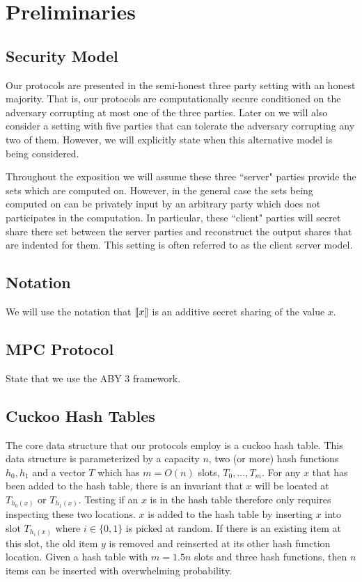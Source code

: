 \section{Preliminaries}


\subsection{Security Model}

Our protocols are presented in the semi-honest three party setting with an honest majority. That is, our protocols are computationally secure conditioned on the adversary corrupting at most one of the three parties. Later on we will also consider a setting with five parties that can tolerate the adversary corrupting any two of them. However, we will explicitly state when this alternative model is being considered.

Throughout the exposition we will assume these three ``server" parties provide the sets which are computed on. However, in the general case the sets being computed on can be privately input by an arbitrary party which does not participates in the computation. In particular, these ``client" parties will secret share there set between the server parties and reconstruct the output shares that are indented for them. This setting is often referred to as the client server model\cite{aby3, secureML}. 


\subsection{Notation}

We will use the notation that $\llbracket x\rrbracket$ is an additive secret sharing of the value $x$.


\subsection{MPC Protocol}

State that we use the ABY 3 framework. 

\subsection{Cuckoo Hash Tables}

The core data structure that our protocols employ is a cuckoo hash table. This data structure is parameterized by a capacity $n$, two (or more) hash functions $h_0, h_1$ and a vector $T$ which has $m=O(n)$ slots, $T_0, ..., T_m$. For any $x$ that has been added to the hash table, there is an invariant that $x$ will be located at $T_{h_0(x)}$ or $T_{h_1(x)}$. Testing if an $x$ is in the hash table therefore only requires inspecting these two locations. $x$ is added to the hash table by inserting $x$ into slot $T_{h_i(x)}$ where $i\in \{0,1\}$ is picked at random. If there is an existing item at this slot, the old item $y$ is removed and reinserted at its other hash function location. Given a hash table with $m=1.5n$ slots and three hash functions, then $n$ items can be inserted with overwhelming probability\cite{DRRT18}. 